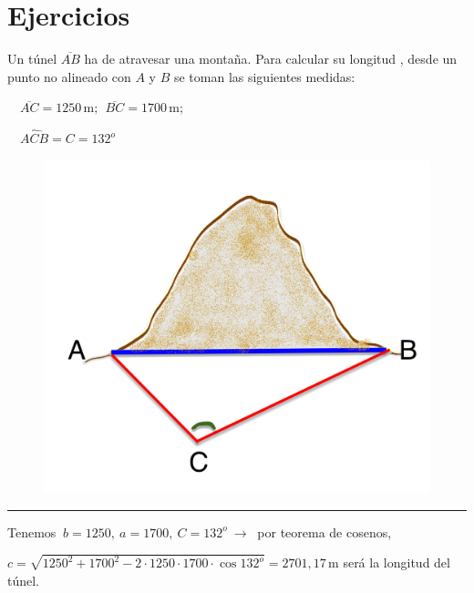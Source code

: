

\vspace{0.3cm}
\section{Ejercicios}
\vspace{0.3cm}





\begin{miejercicio}


\begin{multicols}{2}
Un túnel $\overline{AB}$ ha de atravesar una montaña. Para calcular su longitud , desde un punto no alineado con $A$ y $B$ se toman las siguientes medidas:

$\quad \overline{AC}=1250\, \mathrm{m};\ \ \overline{BC}=1700\, \mathrm{m};$

$\quad \widehat{ACB}=C=132^o$
	\begin{figure}[H]
	\centering
	\includegraphics[width=.3\textwidth]{img-triang/triang15.png}
\end{figure}
\end{multicols}

\vspace{-10mm}
\rule{250pt}{0.1pt}

\vspace{2mm} Tenemos $\ b=1250,\ a=1700, \ C=132^o \ \to \ $ por teorema de cosenos,

\vspace{2mm} $c=\sqrt{1250^2+1700^2-2\cdot 1250\cdot 1700\cdot \cos 132^o}=2701,17 \, \textrm{m}$ será la  longitud del túnel.

	
\end{miejercicio}






